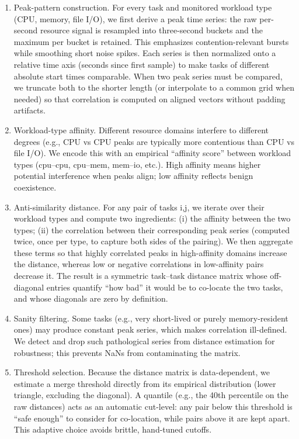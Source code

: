 \begin{enumerate}
    \item Peak-pattern construction. For every task and monitored workload type (CPU, memory, file I/O), we first derive a peak time series: the raw per-second resource signal is resampled into three-second buckets and the maximum per bucket is retained. This emphasizes contention-relevant bursts while smoothing short noise spikes. Each series is then normalized onto a relative time axis (seconds since first sample) to make tasks of different absolute start times comparable. When two peak series must be compared, we truncate both to the shorter length (or interpolate to a common grid when needed) so that correlation is computed on aligned vectors without padding artifacts.
    \item Workload-type affinity. Different resource domains interfere to different degrees (e.g., CPU vs CPU peaks are typically more contentious than CPU vs file I/O). We encode this with an empirical “affinity score” between workload types (cpu–cpu, cpu–mem, mem–io, etc.). High affinity means higher potential interference when peaks align; low affinity reflects benign coexistence.
    \item Anti-similarity distance. For any pair of tasks i,j, we iterate over their workload types and compute two ingredients: (i) the affinity between the two types; (ii) the correlation between their corresponding peak series (computed twice, once per type, to capture both sides of the pairing). We then aggregate these terms so that highly correlated peaks in high-affinity domains increase the distance, whereas low or negative correlations in low-affinity pairs decrease it. The result is a symmetric task–task distance matrix whose off-diagonal entries quantify “how bad” it would be to co-locate the two tasks, and whose diagonals are zero by definition.
    \item Sanity filtering. Some tasks (e.g., very short-lived or purely memory-resident ones) may produce constant peak series, which makes correlation ill-defined. We detect and drop such pathological series from distance estimation for robustness; this prevents NaNs from contaminating the matrix.
    \item Threshold selection. Because the distance matrix is data-dependent, we estimate a merge threshold directly from its empirical distribution (lower triangle, excluding the diagonal). A quantile (e.g., the 40th percentile on the raw distances) acts as an automatic cut-level: any pair below this threshold is “safe enough” to consider for co-location, while pairs above it are kept apart. This adaptive choice avoids brittle, hand-tuned cutoffs.

\end{enumerate}
